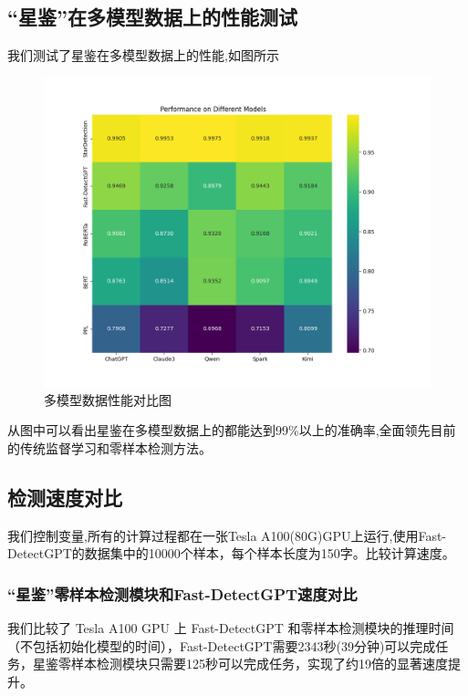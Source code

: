 \documentclass[a4paper]{report}
\begin{document}
\subsection{“星鉴”在多模型数据上的性能测试}
我们测试了星鉴在多模型数据上的性能,如图所示
\begin{figure}[H]
	\centering
	\includegraphics[width=\textwidth]{figures/不同模型性能对比.png}
	\caption{多模型数据性能对比图}
	\label{多模型数据性能对比}
\end{figure}
从图中可以看出星鉴在多模型数据上的都能达到99\%以上的准确率,全面领先目前的传统监督学习和零样本检测方法。
\subsection{检测速度对比}
我们控制变量,所有的计算过程都在一张Tesla A100(80G)GPU上运行,使用Fast-DetectGPT的数据集中的10000个样本，每个样本长度为150字。比较计算速度。
\subsubsection{“星鉴”零样本检测模块和Fast-DetectGPT速度对比}
我们比较了 Tesla A100 GPU 上 Fast-DetectGPT 和零样本检测模块的推理时间（不包括初始化模型的时间），Fast-DetectGPT需要2343秒(39分钟)可以完成任务，星鉴零样本检测模块只需要125秒可以完成任务，实现了约19倍的显著速度提升。
\end{document}
